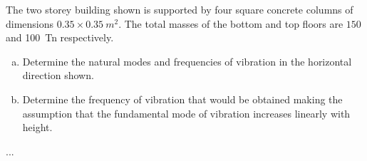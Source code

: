 
\begin{Exercise}[label={two_storey}]
The two storey building shown is supported by four square concrete columns of dimensions $0.35 \times \SI{0.35}{m^2}$. The total masses of the bottom and top floors are $150$ and \qty{100}{Tn} respectively.
\begin{enumerate}[(a)]
    \item Determine the natural modes and frequencies of vibration in the horizontal direction shown.
    \item Determine the frequency of vibration that would be obtained making the assumption that the fundamental mode of vibration increases linearly with height.
\end{enumerate}

\begin{center}
\end{center}

\shortAnswer ...
\end{Exercise}



\begin{Answer}[ref={two_storey}]
\end{Answer}

